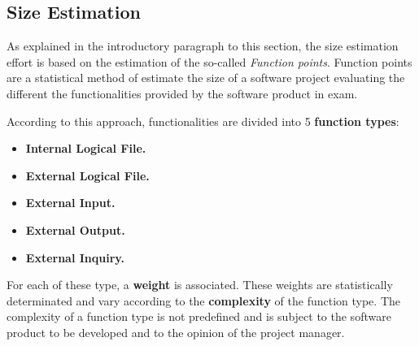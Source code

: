 \subsection{Size Estimation}

As explained in the introductory paragraph to this section, the size estimation effort is based on the estimation of the so-called \textit{Function points}. Function points are a statistical method of estimate the size of a software project evaluating the different the functionalities provided by the software product in exam.

According to this approach, functionalities are divided into 5 \textbf{function types}:

\begin{itemize}
	\item \textbf{Internal Logical File.}
	\item \textbf{External Logical File.}
	\item \textbf{External Input.}
	\item \textbf{External Output.}
	\item \textbf{External Inquiry.}
\end{itemize}

For each of these type, a \textbf{weight} is associated. These weights are statistically determinated and vary according to the \textbf{complexity} of the function type.
The complexity of a function type is not predefined and is subject to the software product to be developed and to the opinion of the project manager.


